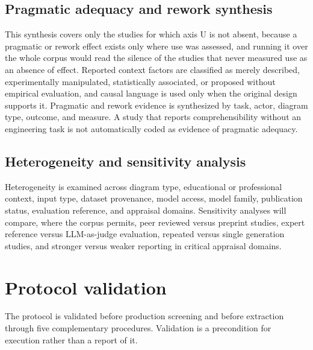 \subsection{Pragmatic adequacy and rework synthesis}

This synthesis covers only the studies for which axis U is not absent, because a pragmatic or rework effect exists only where use was assessed, and running it over the whole corpus would read the silence of the studies that never measured use as an absence of effect. Reported context factors are classified as merely described, experimentally manipulated, statistically associated, or proposed without empirical evaluation, and causal language is used only when the original design supports it. Pragmatic and rework evidence is synthesized by task, actor, diagram type, outcome, and measure. A study that reports comprehensibility without an engineering task is not automatically coded as evidence of pragmatic adequacy.

\subsection{Heterogeneity and sensitivity analysis}

Heterogeneity is examined across diagram type, educational or professional context, input type, dataset provenance, model access, model family, publication status, evaluation reference, and appraisal domains. Sensitivity analyses will compare, where the corpus permits, peer reviewed versus preprint studies, expert reference versus LLM-as-judge evaluation, repeated versus single generation studies, and stronger versus weaker reporting in critical appraisal domains.

\section{Protocol validation}
\label{sec:protocol_validation}

The protocol is validated before production screening and before extraction through five complementary procedures. Validation is a precondition for execution rather than a report of it.

